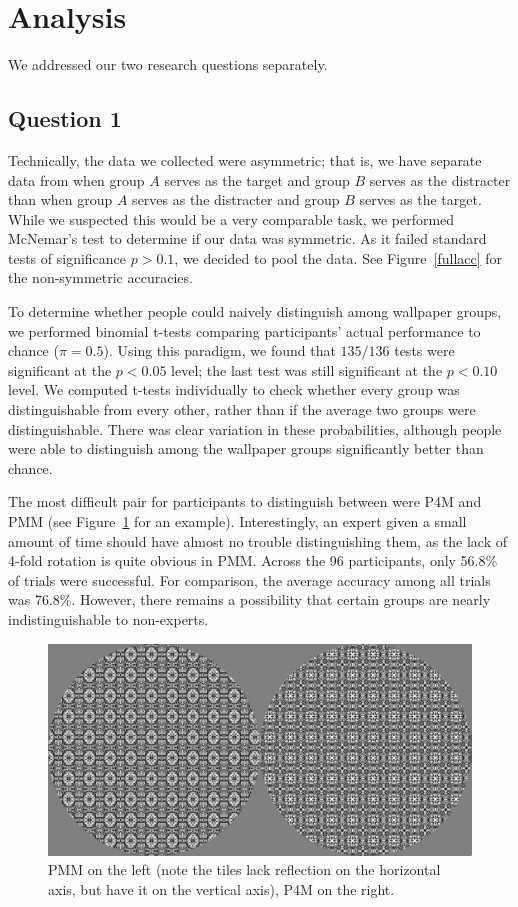 \section{Analysis}
We addressed our two research questions separately.

\subsection{Question 1}
Technically, the data we collected were asymmetric; that is, we have separate data from when group $A$ serves as the target and group $B$ serves as the distracter than when group $A$ serves as the distracter and group $B$ serves as the target. While we suspected this would be a very comparable task, we performed McNemar's test to determine if our data was symmetric.  As it failed standard tests of significance $p > 0.1$, we decided to pool the data. See Figure~\ref{fullacc} for the non-symmetric accuracies.

To determine whether people could naively distinguish among wallpaper groups, we performed binomial t-tests comparing participants' actual performance to chance ($\pi=0.5$). Using this paradigm, we found that $135/136$ tests were significant at the $p<0.05$ level; the last test was still significant at the $p<0.10$ level. We computed t-tests individually to check whether every group was distinguishable from every other, rather than if the average two groups were distinguishable. There was clear variation in these probabilities, although people were able to distinguish among the wallpaper groups significantly better than chance. 

The most difficult pair for participants to distinguish between were P4M and PMM (see Figure~\ref{pmmp4m} for an example). Interestingly, an expert given a small amount of time should have almost no trouble distinguishing them, as the lack of 4-fold rotation is quite obvious in PMM. Across the 96 participants, only 56.8\% of trials were successful. For comparison, the average accuracy among all trials was 76.8\%. However, there remains a possibility that certain groups are nearly indistinguishable to non-experts.

\begin{figure}[!ht]
\centering
\includegraphics[width=0.9\columnwidth]{pmmp4m}
\caption{PMM on the left (note the tiles lack reflection on the horizontal axis, but have it on the vertical axis), P4M on the right.}
\label{pmmp4m}
\end{figure}

